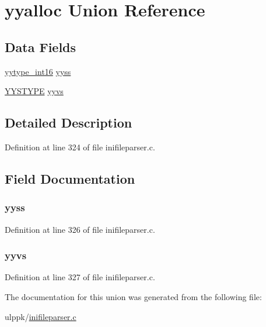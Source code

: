 \hypertarget{unionyyalloc}{\section{yyalloc Union Reference}
\label{unionyyalloc}
}
\subsection*{Data Fields}
\begin{DoxyCompactItemize}
\item 
\hyperlink{inifileparser_8c_ade5b97f0021a4f6c5922ead3744ab297}{yytype\-\_\-int16} \hyperlink{unionyyalloc_aa3c19a8a3172238f9a16ea99f7cf0a85}{yyss}
\item 
\hyperlink{union_y_y_s_t_y_p_e}{Y\-Y\-S\-T\-Y\-P\-E} \hyperlink{unionyyalloc_a8507e56e72dfc653fb4476d234ecce85}{yyvs}
\end{DoxyCompactItemize}


\subsection{Detailed Description}


Definition at line 324 of file inifileparser.\-c.



\subsection{Field Documentation}
\hypertarget{unionyyalloc_aa3c19a8a3172238f9a16ea99f7cf0a85}{
\subsubsection[{yyss}]{ yyss}}\label{unionyyalloc_aa3c19a8a3172238f9a16ea99f7cf0a85}


Definition at line 326 of file inifileparser.\-c.

\hypertarget{unionyyalloc_a8507e56e72dfc653fb4476d234ecce85}{
\subsubsection[{yyvs}]{ yyvs}}\label{unionyyalloc_a8507e56e72dfc653fb4476d234ecce85}


Definition at line 327 of file inifileparser.\-c.



The documentation for this union was generated from the following file\-:\begin{DoxyCompactItemize}
\item 
ulppk/\hyperlink{inifileparser_8c}{inifileparser.\-c}\end{DoxyCompactItemize}
